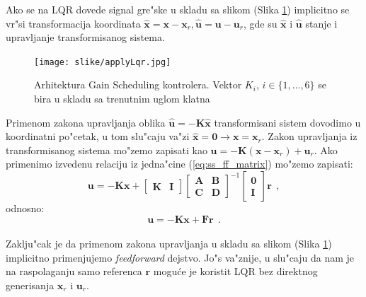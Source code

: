 \documentclass[a4paper,11pt]{article}
\theoremstyle{definition} \newtheorem{deff}{Definicija}[section]
\theoremstyle{definition} \newtheorem{prim}[deff]{Primer}
\theoremstyle{plain} \newtheorem{teor}[deff]{Teorema}
\newcommand{\vect}[1]{\boldsymbol{\mathbf{#1}}}
\begin{document}
	Ako se na LQR dovede signal gre"ske u skladu sa slikom (Slika \ref{fig:archGain}) implicitno se vr"si transformacija koordinata $\hat{\vect{x}} = \vect{x} - \vect{x}_r, \hat{\vect{u}} = \vect{u} - \vect{u}_r$, gde su $\hat{\vect{x}}$ i $\hat{\vect{u}}$ stanje i upravljanje transformisanog sistema.
	
	\begin{figure}[!h]
		\centering
		\texttt{[image: slike/applyLqr.jpg]}
		\caption{Arhitektura Gain Scheduling kontrolera. Vektor $K_i$, $i \in \{1, \ldots, 6\}$ se bira u skladu sa trenutnim uglom klatna \cite{inicijalna}}
		\label{fig:archGain}
	\end{figure} 
	Primenom zakona upravljanja oblika $\hat{\vect{u}} = - \vect{K}\hat{\vect{x}}$ transformisani sistem dovodimo u koordinatni po"cetak, u tom slu"caju va"zi $\hat{\vect{x}} = \vect{0} \rightarrow \vect{x} = \vect{x}_r$. Zakon upravljanja iz transformisanog sistema mo"zemo zapisati kao $\vect{u} = -\vect{K}(\vect{x} - \vect{x}_r) + \vect{u}_r$. Ako primenimo izvedenu relaciju iz jedna"cine (\ref{eq:ss_ff_matrix}) mo"zemo zapisati:
	\begin{equation}
		\vect{u} = -\vect{K}\vect{x} + \begin{bmatrix} \vect{K} &  \vect{I} \end{bmatrix}
		\begin{bmatrix} \vect{A} &  \vect{B} \\  \vect{C} &  \vect{D} \end{bmatrix}^{-1}
		\begin{bmatrix} \vect{0} \\  \vect{I} \end{bmatrix} \vect{r}~~,
	\end{equation}
	odnosno:
	\begin{equation}\label{eq:ff_final}
		\vect{u} = -\vect{K}\vect{x} + \vect{F} \vect{r}~~.
	\end{equation}\\
	
	Zaklju"cak je da primenom zakona upravljanja u skladu sa slikom (Slika \ref{fig:archGain}) implicitno primenjujemo \emph{feedforward} dejstvo. Jo"s va"znije, u slu"caju da nam je na raspolaganju samo referenca $\mathbf{r}$ mogu\'ce je koristit LQR bez direktnog generisanja $\vect{x}_r$ i $\vect{u}_r$.
	
	
	
	

	
	
	
	
	
	
\end{document}
